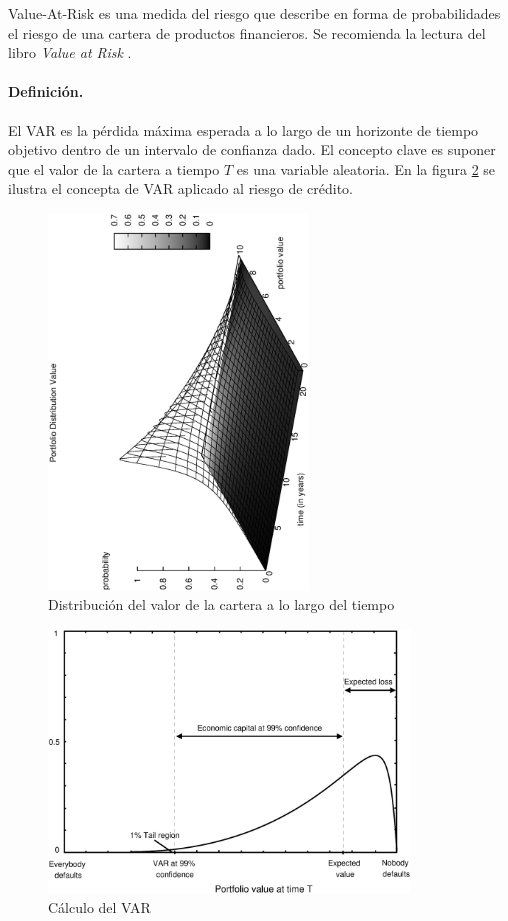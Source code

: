 Value-At-Risk es una medida del riesgo que describe en forma de probabilidades
el riesgo de una cartera de productos financieros. Se recomienda la lectura del
libro \emph{Value at Risk} \cite{var:jorion}.

\paragraph{Definici\'on.} El VAR es la p\'erdida m\'axima esperada a lo largo
de un horizonte de tiempo objetivo dentro de un intervalo de confianza dado.
\newline
\newline
El concepto clave es suponer que el valor de la cartera a tiempo $T$ es una 
variable aleatoria. En la figura \ref{creditvar} se ilustra el concepta de VAR 
aplicado al riesgo de cr\'edito.

\begin{figure}[!hb]
\begin{center}
\includegraphics[height=10cm, angle=-90]{./images/pdistrib.ps}
\caption{Distribuci\'on del valor de la cartera a lo largo del tiempo}
\label{pdistrib}
\end{center}
\end{figure}

\begin{figure}[!hb]
\begin{center}
\includegraphics[height=7cm, angle=0]{./images/creditvar.eps}
\caption{C\'alculo del VAR}
\label{creditvar}
\end{center}
\end{figure}

